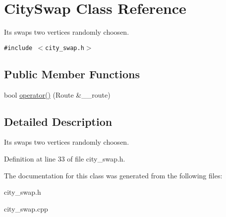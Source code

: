 \hypertarget{classCitySwap}{
\section{City\-Swap Class Reference}
\label{classCitySwap}
}
Its swaps two vertices randomly choosen.  


{\tt \#include $<$city\_\-swap.h$>$}

\subsection*{Public Member Functions}
\begin{CompactItemize}
\item 
\hypertarget{classCitySwap_7e6958b62048c89604cbf046b86bdf2d}{
bool \hyperlink{classCitySwap_7e6958b62048c89604cbf046b86bdf2d}{operator()} (Route \&\_\-\_\-route)}
\label{classCitySwap_7e6958b62048c89604cbf046b86bdf2d}

\end{CompactItemize}


\subsection{Detailed Description}
Its swaps two vertices randomly choosen. 



Definition at line 33 of file city\_\-swap.h.

The documentation for this class was generated from the following files:\begin{CompactItemize}
\item 
city\_\-swap.h\item 
city\_\-swap.cpp\end{CompactItemize}
